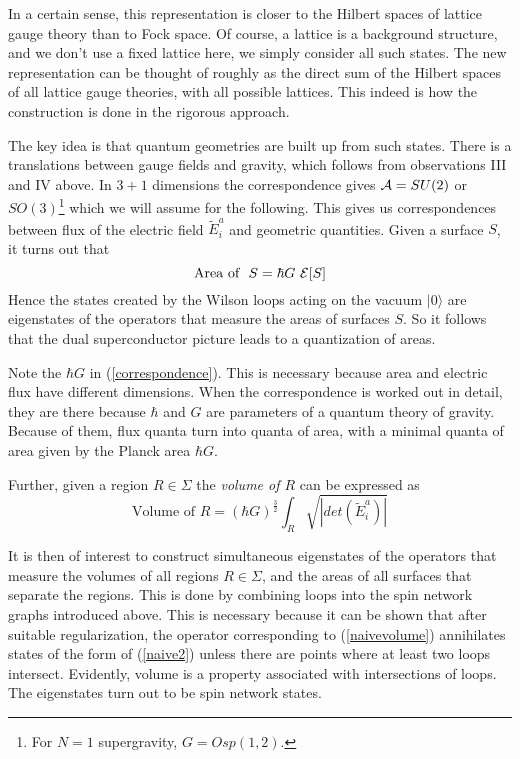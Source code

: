\documentclass[12pt]{article}
\newcommand{\f}{\begin{equation}}
\newcommand{\ff}{\end{equation}}
\begin{document}
In a certain sense, this representation is closer to the Hilbert spaces of
lattice gauge theory than to Fock space.    Of 
course, a lattice is a background structure, and we don't use a fixed 
lattice here, we simply consider all such states. The new representation
can be thought of roughly as the direct sum of the Hilbert spaces of 
all lattice gauge theories, with 
all possible lattices.  This indeed is how the construction is done in
the rigorous approach.


The key idea is that quantum geometries are built up from such 
states.  There is a translations between gauge fields and 
gravity, which follows from observations III and IV above.   In $3+1$ dimensions the
correspondence gives
${\cal A}=SU(2)$ or $SO(3)$\footnote{For $N=1$ supergravity, $G= Osp(1,2)$.} which 
we will assume for the following.
This gives us  correspondences between flux of the electric field
$\tilde{E}^a_i$ and geometric quantities. Given a surface $S$, it 
turns out that
\f
\mbox{Area of } \ S =  \hbar G \  {\cal E}[S]
\label{correspondence}
\ff
Hence the states created by the Wilson loops acting on the vacuum
$|0\rangle$ 
are eigenstates  of the operators
that measure the areas of surfaces $S$.
So it follows that the dual superconductor picture leads to a 
quantization of areas.  

Note the $\hbar G$ in  (\ref{correspondence}). This 
is necessary because area and electric flux have different dimensions. 
When the correspondence is worked out in detail, they are there 
because   $\hbar$ and $G$ are parameters of a quantum theory 
of gravity. Because of them, flux quanta turn into quanta of area, 
with a minimal quanta of area given by the Planck area $\hbar G$. 

Further, given a region $R \in \Sigma$ the {\it volume of $R$}  can be
expressed as 
\f
\mbox{Volume of } R = (\hbar G)^{\frac{3}{2}}
\int_R  \sqrt{ |det( \tilde{E}^a_i ) |} 
\label{naivevolume}
\ff

It is then of interest to construct simultaneous eigenstates of the operators that 
measure the volumes of all regions $R \in \Sigma$, and the areas of all surfaces
that separate the regions.  This is done by 
combining loops into the spin network graphs introduced above.  
This is necessary because it can be 
shown that after suitable regularization, the operator corresponding to 
(\ref{naivevolume}) annihilates states of the form of (\ref{naive2})
unless there are points where at least two loops intersect. 
Evidently, volume is a property associated with intersections of 
loops. The eigenstates turn out to be spin network states.  
\end{document}
